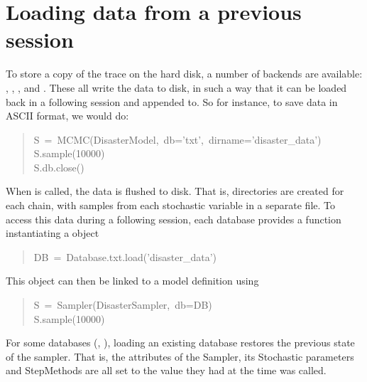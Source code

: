 
\hypertarget{loading-data-from-a-previous-session}{}
\section*{Loading data from a previous session}
\label{loading-data-from-a-previous-session}

To store a copy of the trace on the hard disk, a number of backends are available: , , ,  and . These all write the data to disk, in such a way that it can be loaded back in a following session and appended to. So for instance, to save data in ASCII format, we would do:
\begin{quote}{\ttfamily \raggedright \noindent
S~=~MCMC(DisasterModel,~db='txt',~dirname='disaster{\_}data')~\\
S.sample(10000)~\\
S.db.close()
}\end{quote}

When  is called, the data is flushed to disk. That is, directories are created for each chain, with samples from each stochastic variable in a separate file. To access this data during a following session, each database provides a  function instantiating a  object
\begin{quote}{\ttfamily \raggedright \noindent
DB~=~Database.txt.load('disaster{\_}data')
}\end{quote}

This  object can then be linked to a model definition using
\begin{quote}{\ttfamily \raggedright \noindent
S~=~Sampler(DisasterSampler,~db=DB)~\\
S.sample(10000)
}\end{quote}

For some databases (, ), loading an existing database restores the previous state of the sampler. That is, the attributes of the Sampler, its Stochastic parameters and StepMethods are all set to the value they had at the time  was called.



